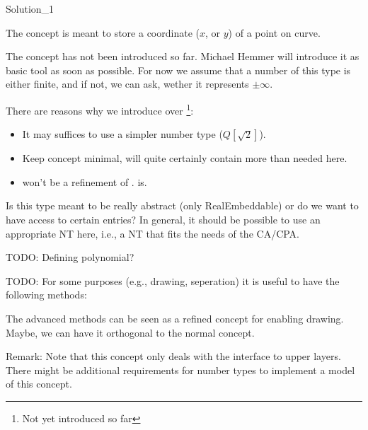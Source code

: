 \begin{ccRefConcept}{Solution_1}

\ccDefinition

The concept  is meant to store a coordinate ($x$, or $y$) of
a point on curve. 

\ccRefines

The concept  has not been introduced so far. Michael
Hemmer will introduce it as basic tool as soon as possible. For
now we assume that a number of this type is either finite, and if not,
we can ask, wether it represents $\pm\infty$.

There are reasons why we introduce  over 
\footnote{Not yet introduced so far}:
\begin{itemize}
\item It may suffices to use a simpler number type ($Q[\sqrt{2}]$).
\item Keep concept minimal,  will quite certainly
contain more than needed here.
\item {} won't be a refinement of .
 is.
\end{itemize}

\begin{ccAdvanced}

\ccTypes



\ccAccessFunctions

Is this type meant to be really abstract (only RealEmbeddable) or 
do we want to have access
to certain entries? In general, it should be possible to use an appropriate
NT here, i.e., a NT that fits the needs of the CA/CPA.

TODO: Defining polynomial?

TODO: For some purposes (e.g., drawing, seperation) it is useful to have the 
following methods:



The advanced methods can be seen as a refined concept for enabling drawing. 
Maybe, we can have it orthogonal to the normal concept.

\end{ccAdvanced}

Remark: Note that this concept only deals with the interface to upper
layers. There might be additional requirements for number types to 
implement a model of this concept.

\ccHasModels
{}

\end{ccRefConcept}
